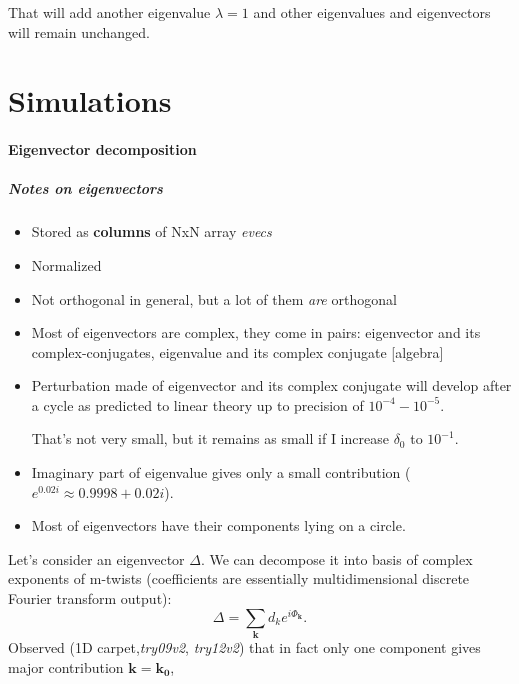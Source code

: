 \documentclass[a4paper,10pt]{article}
\renewcommand*{\vec}[1]{\mathbf{#1}}
\newcommand*{\D}{\Delta}%
\begin{document}
   That will add another eigenvalue $\lambda=1$ and other eigenvalues and eigenvectors will remain unchanged.



\clearpage
\part*{Simulations}

\subsection{Eigenvector decomposition}
\label{sec:evec}

\subsubsection{Notes on eigenvectors}

\begin{itemize}

\item Stored as \textbf{columns} of NxN array \textit{evecs}
\item Normalized
\item Not orthogonal in general, but a lot of them \emph{are} orthogonal
\item Most of eigenvectors are complex, they come in pairs: eigenvector and its complex-conjugates, eigenvalue and its complex conjugate [algebra]
\item Perturbation made of eigenvector and its complex conjugate will develop after a cycle as predicted to linear theory up to precision of $10^{-4} - 10^{ -5}$.

 That's not very small, but it remains as small if I increase $\delta_0$ to $10 ^{ -1}$.
 
\item Imaginary part of eigenvalue gives only a small contribution ($e^{0.02 i} \approx 0.9998 + 0.02 i$).
\item Most of eigenvectors have their components lying on a circle.

\end{itemize}

Let's consider an eigenvector $\D$. We can decompose it into basis of complex exponents of m-twists (coefficients are essentially multidimensional discrete Fourier transform output):
$$
\D = \sum_{\vec{k}} d_k e^{i \Phi_\vec{k}}.
$$
Observed (1D carpet,\textit{try09v2}, \textit{try12v2}) that in fact only one component gives major contribution $\vec{k}=\mathbf{k_0}$,
\end{document}
